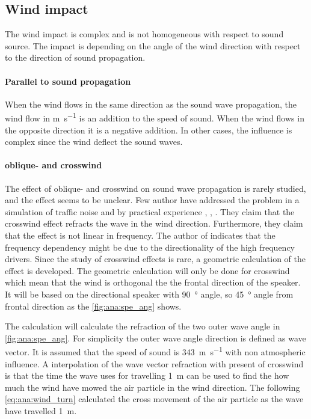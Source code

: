 \subsection{Wind impact}
The wind impact is complex and is not homogeneous with respect to sound source. The impact is depending on the angle of the wind direction with respect to the direction of sound propagation. 


\paragraph{Parallel to sound propagation} When the wind flows in the same direction as the sound wave propagation, the wind flow in \si{\meter\per\second} is an addition to the speed of sound. When the wind flows in the opposite direction it is a negative addition.  In other cases, the influence is complex since the wind deflect the sound waves.

\paragraph{oblique- and crosswind} The effect of oblique- and crosswind on sound wave propagation is rarely studied, and the effect seems to be unclear. Few author have addressed the problem in a simulation of traffic noise and by practical experience \citep{effect_of_wind}, \citep{crosswind_effect_2016}, \citep{BALLOU2008xi}. They claim that the crosswind effect refracts the wave in the wind direction. Furthermore, they claim that the effect is not linear in frequency. The author of \citep{BALLOU2008xi} indicates that the frequency dependency might be due to the directionality of the high frequency drivers. Since the study of crosswind effects is rare, a geometric calculation of the effect is developed. The geometric calculation will only be done for crosswind which mean that the wind is orthogonal the the frontal direction of the speaker. It will be based on the directional speaker with \SI{90}{\degree} angle, so \SI{45}{\degree} angle from frontal direction as the \autoref{fig:ana:spe_ang} shows.




The calculation will calculate the refraction of the two outer wave angle in \autoref{fig:ana:spe_ang}. For simplicity the outer wave angle direction is defined as wave vector. It is assumed that the speed of sound is \SI{343}{\meter\per\second} with non atmospheric influence. A interpolation of the wave vector refraction with present of crosswind is that the time the wave uses for travelling \SI{1}{\meter} can be used to find the how much the wind have mowed the air particle in the wind direction. The following \autoref{eq:ana:wind_turn} calculated the cross movement of the air particle as the wave have travelled  \SI{1}{\meter}.

